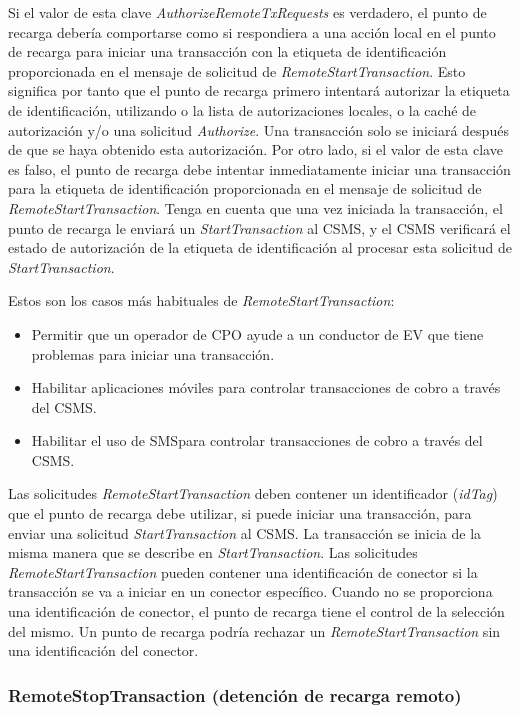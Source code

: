 \documentclass[12pt,a4paper,onecolumn,oneside]{report}
\begin{document}
Si el valor de esta clave \textit{AuthorizeRemoteTxRequests} es verdadero, el punto de recarga debería comportarse como si respondiera a una acción local en el punto de recarga para iniciar una transacción con la etiqueta de identificación proporcionada en el mensaje de solicitud de \textit{RemoteStartTransaction}. Esto significa por tanto que el punto de recarga primero intentará autorizar la etiqueta de identificación, utilizando o la lista de autorizaciones locales, o la caché de autorización y/o una solicitud \textit{Authorize}. Una transacción solo se iniciará después de que se haya obtenido esta autorización. Por otro lado, si el valor de esta clave es falso, el punto de recarga debe intentar inmediatamente iniciar una transacción para la etiqueta de identificación proporcionada en el mensaje de solicitud de \textit{RemoteStartTransaction}. Tenga en cuenta que una vez iniciada la transacción, el punto de recarga le enviará un \textit{StartTransaction} al CSMS, y el CSMS verificará el estado de autorización de la etiqueta de identificación al procesar esta solicitud de \textit{StartTransaction}.

Estos son los casos más habituales de \textit{RemoteStartTransaction}:
\begin{itemize}
\item Permitir que un operador de CPO ayude a un conductor de EV que tiene problemas para iniciar una transacción.
\item Habilitar aplicaciones móviles para controlar transacciones de cobro a través del CSMS.
\item Habilitar el uso de SMSpara controlar transacciones de cobro a través del CSMS.

\end{itemize}

Las solicitudes \textit{RemoteStartTransaction} deben contener un identificador (\textit{idTag}) que el punto de recarga debe utilizar, si puede iniciar una transacción, para enviar una solicitud \textit{StartTransaction} al CSMS. La transacción se inicia de la misma manera que se describe en \textit{StartTransaction}. Las solicitudes \textit{RemoteStartTransaction} pueden contener una identificación de conector si la transacción se va a iniciar en un conector específico. Cuando no se proporciona una identificación de conector, el punto de recarga tiene el control de la selección del mismo. Un punto de recarga podría rechazar un \textit{RemoteStartTransaction} sin una identificación del conector.


\subsubsection{RemoteStopTransaction (detención de recarga remoto)}
\label{RemoteStopTransaction (detención de recarga remoto)}
\end{document}
